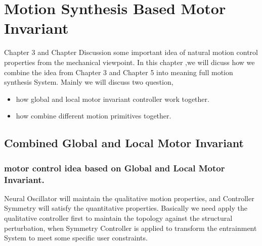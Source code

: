 \chapter {Motion Synthesis Based Motor Invariant}
\ifpdf
    \graphicspath{{CombineFramework/CombineFrameworkFigs/PNG/}{CombineFramework/CombineFrameworkFigs/PDF/}{CombineFramework/CombineFrameworkFigs/}}
\else
    \graphicspath{{CombineFramework/CombineFrameworkFigs/EPS/}{CombineFramework/CombineFrameworkFigs/}}
\fi

Chapter 3 and Chapter Discussion some important idea of natural motion control properties from the mechanical viewpoint.
In this chapter ,we will dicuss how we combine the idea from Chapter 3 and Chapter 5 into meaning full motion synthesis System.
Mainly we will discuss two question,
\begin{itemize}
\item how global and local motor invariant controller work together.
\item how combine different motion primitives together.
\end{itemize}

\section{Combined Global and Local Motor Invariant}

\subsection{ motor control idea based on Global and Local  Motor Invariant.}

Neural Oscillator will maintain the qualitative motion properties, and Controller Symmetry will satisfy the quantitative properties.
Basically we need apply the qualitative controller first to maintain the topology against the structural perturbation, 
when Symmetry Controller is applied to transform the entrainment System to meet some specific user constraints.


